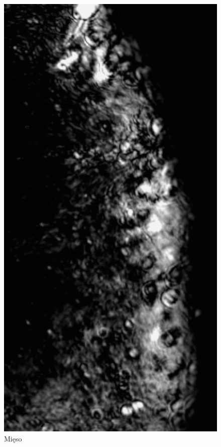 \documentclass[a4paper,12pt]{article}
\begin{document}
\begin{figure} [H]
  \begin{center}
    \includegraphics[width = 15cm]{data/5MIES2.png}
    \caption{Mięso}
  \end{center}
\end{figure}
\end{document}
